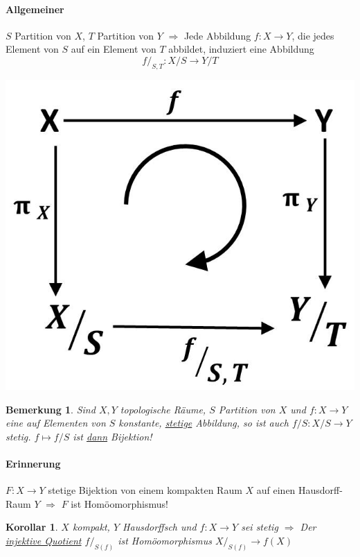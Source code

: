 \documentclass[a4paper,11pt,notitlepage]{report}
\newtheorem{corollary}{Korollar}[chapter]
\newtheorem{remark}{Bemerkung}[chapter]
\begin{document}
\paragraph{Allgemeiner}
$S$ Partition von $X$, $T$ Partition von $Y$
\newline
$\Rightarrow$ Jede Abbildung $f \colon X \rightarrow Y$, die jedes Element von $S$ auf ein Element von $T$ abbildet, induziert eine Abbildung 
$$f/_{S,T} \colon X/S \rightarrow Y/T$$
\begin{center}
	\includegraphics[scale=0.4]{images/f_modulo_S_T_Diagramm.jpg}
\end{center}

\begin{remark}
	Sind $X,Y$ topologische Räume, $S$ Partition von $X$ und $f \colon X \rightarrow Y$ eine auf Elementen von $S$ konstante, \underline{stetige} Abbildung, so ist auch $f/S \colon X/S \rightarrow Y$ stetig.
	\newline
	$f \mapsto f/S$ ist \underline{dann} Bijektion! 
\end{remark}

\paragraph{Erinnerung}
$F \colon X \rightarrow Y$ stetige Bijektion von einem kompakten Raum $X$ auf einen Hausdorff-Raum $Y$ $\Rightarrow$ $F$ ist Homöomorphismus!

\begin{corollary}
	$X$ kompakt, $Y$ Hausdorffsch und $f \colon X \rightarrow Y$ sei stetig 
	$\Rightarrow$ Der \underline{injektive Quotient} $f/_{S(f)}$ ist Homöomorphismus $X/_{S(f)} \rightarrow f(X)$
\end{corollary}
\end{document}
